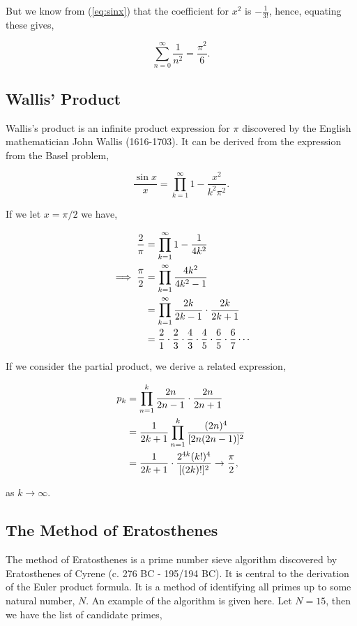 \documentclass[11pt]{amsart}
\begin{document}
But we know from (\ref{eq:sinx}) that the coefficient for $x^2$ is $-\frac{1}{3!}$, hence, equating these gives,

$$
\sum_{n=0}^{\infty}\frac{1}{n^2} = \frac{\pi^2}{6}.
$$

\subsection{Wallis' Product}

Wallis's product is an infinite product expression for $\pi$ discovered by the English mathematician John Wallis (1616-1703). It can be derived from the expression from the Basel problem,

$$
\frac{\sin x}{x} = \prod_{k=1}^{\infty}1 - \frac{x^2}{k^2\pi^2}.
$$

If we let $x = \pi/2$ we have,

\begin{align}
\frac{2}{\pi} &= \prod_{k=1}^{\infty}1 - \frac{1}{4k^2} \notag \\
\implies \frac{\pi}{2} &= \prod_{k=1}^{\infty} \frac{4k^2}{4k^2 - 1} \notag \\
&= \prod_{k=1}^{\infty} \frac{2k}{2k - 1} \cdot \frac{2k}{2k + 1} \notag \\
&= \frac{2}{1} \cdot \frac{2}{3} \cdot \frac{4}{3} \cdot \frac{4}{5} \cdot \frac{6}{5} \cdot \frac{6}{7} \cdots \notag
\end{align}

If we consider the partial product, we derive a related expression,

\begin{align}
p_k &= \prod_{n=1}^{k} \frac{2n}{2n - 1} \cdot \frac{2n}{2n + 1} \notag \\
&= \frac{1}{2k + 1} \prod_{n=1}^{k}\frac{(2n)^4}{[2n(2n - 1)]^2} \notag \\
&= \frac{1}{2k + 1} \cdot \frac{2^{4k}(k!)^4}{[(2k)!]^2} \to \frac{\pi}{2}, \notag
\end{align}

as $k \to \infty$.

\subsection{The Method of Eratosthenes}

The method of Eratosthenes is a prime number sieve algorithm discovered by Eratosthenes of Cyrene (c. 276 BC - 195/194 BC). It is central to the derivation of the Euler product formula. It is a method of identifying all primes up to some natural number, $N$. An example of the algorithm is given here. Let $N = 15$, then we have the list of candidate primes,
\end{document}
